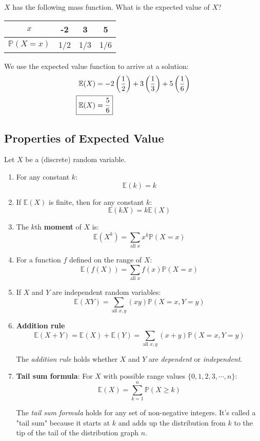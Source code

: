 \documentclass[titlepage, 12pt, leqno]{article}
\begin{document}
\begin{ex}
    $X$ has the following mass function. What is the expected value of $X$?
    \begin{center}
    \begin{tabular}{c|c c c}
        $x$&-2&3&5\\
        \hline
        $\mathbb{P}(X=x)$&1/2&1/3&1/6
    \end{tabular}
    \end{center}

    We use the expected value function to arrive at a solution:
   \begin{align*}
       \mathbb{E}(X) &= -2\left(\frac{1}{2}\right) + 3\left(\frac{1}{3}\right) +
       5\left(\frac{1}{6}\right) \\
       \Aboxed{ \mathbb{E}(X) &= \frac{5}{6}} 
   \end{align*}
\end{ex}

\pagebreak
\subsection{Properties of Expected Value}
Let $X$ be a (discrete) random variable.
\begin{enumerate}
    \item For any constant $k$:
        \[
        \mathbb{E}(k) = k
        \]
    \item If $ \mathbb{E}(X)$ is finite, then for any constant $k$:
        \[
        \mathbb{E}(kX) = k \mathbb{E}(X)
        \]
    \item The $k$th \textbf{moment} of $X$ is:
        \[
        \mathbb{E}(X^k) = \sum_{ \text{all }x}x^k \mathbb{P}(X=x)
        \]
    \item For a function $f$ defined on the range of $X$:
        \[
        \mathbb{E}(f(X)) = \sum_{ \text{all }x}f(x)\mathbb{P}(X=x)
        \]
    \item If $X$ and $Y$ are independent random variables:
        \[
        \mathbb{E}(XY) = \sum_{ \text{all }x,y}(xy)\mathbb{P}(X=x, Y=y)
        \]
    \item \textbf{Addition rule}
        \[
        \mathbb{E}(X+Y) = \mathbb{E}(X) + \mathbb{E}(Y)
        = \sum_{ \text{all }x,y}(x+y)\mathbb{P}(X=x, Y=y)
        \]
        \begin{note}
            The \textit{addition rule} holds whether $X$ and $Y$ are 
            \textit{dependent} or \textit{independent}.
        \end{note}
        
    \item \textbf{Tail sum formula}: For $X$ with possible range values
        $\{0,1,2,3, \cdots ,n\}$:
        \[
        \mathbb{E}(X) = \sum_{k=1}^{n}\mathbb{P}(X \ge k)
        \]
        \begin{note}
            The \textit{tail sum formula} holds for any set of non-negative
            integers. It's called a "tail sum" because it starts at $k$ and adds
            up the distribution from $k$ to the tip of the tail of the
            distribution graph $n$.
        \end{note}
\end{enumerate}
\end{document}
